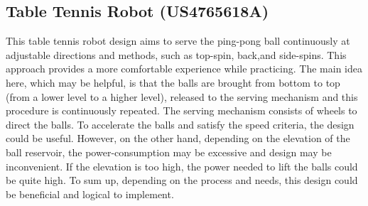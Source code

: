 \documentclass[12pt]{article}
\begin{document}
\subsection{Table Tennis Robot (US4765618A) \cite{Daley1988}}

\begin{minipage}{0.6\textwidth}  %
    This table tennis robot design aims to serve the ping-pong ball continuously at adjustable directions and methods, such as top-spin, back,and side-spins. This approach provides a more comfortable experience while practicing. The main idea here, which may be helpful, is that the balls are brought from bottom to top (from a lower level to a higher level), released to the serving mechanism and this procedure is continuously repeated. The serving mechanism consists of wheels to direct the balls. To accelerate the balls and satisfy the speed criteria, the design could be useful. However, on the other hand, depending on the elevation of the ball reservoir, the power-consumption may be excessive and design may be inconvenient. If the elevation is too high, the power needed to lift the balls could be quite high. To sum up, depending on the process and needs, this design could be beneficial and logical to implement.
\end{minipage}%
\hfill
\end{document}
